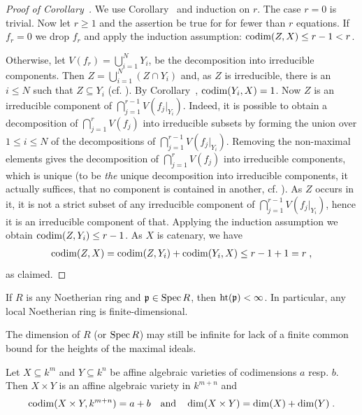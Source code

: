 \documentclass[a4paper,parskip=half,numbers=enddot, DIV=12]{scrreprt}
\begin{document}
\begin{proof}[Proof of Corollary~]
    We use Corollary~ and induction on $r$. The case $r=0$ is trivial. Now let $r\geq1$ and the assertion be true for for fewer than $r$ equations. If $f_r=0$ we drop $f_r$ and apply the induction assumption: $\operatorname{codim}(Z,X) \leq r-1< r $. 
    
    Otherwise, let $V(f_r) = \bigcup_{i=1}^N Y_i$, be the decomposition into irreducible components. Then $Z=\bigcup_{i=1}^N (Z\cap Y_i)$ and, as $Z$ is irreducible, there is an $i\leq N$ such that $Z\subseteq Y_i$ (cf. \cite[Proposition~2.1.1]{alg1}). By Corollary~, $\operatorname{codim}(Y_i,X) = 1$. Now $Z$ is an irreducible component of $ \bigcap_{j=1}^{r-1} V(f_j|_{Y_i})$. Indeed, it is possible to obtain a decomposition of $\bigcap_{j=1}^r V(f_j)$ into irreducible subsets by forming the union over $1\leq i\leq N$ of the decompositions of $ \bigcap_{j=1}^{r-1} V(f_j|_{Y_i})$. Removing the non-maximal elements gives the decomposition of $\bigcap_{j=1}^r V(f_j)$ into irreducible components, which is unique (to be \emph{the} unique decomposition into irreducible components, it actually suffices, that no component is contained in another, cf. \cite[Proposition~2.1.1]{alg1}). As $Z$ occurs in it, it is not a strict subset of any irreducible component of $\bigcap_{j=1}^{r-1} V(f_j|_{Y_i})$, hence it is an irreducible component of that. Applying the induction assumption we obtain $\operatorname{codim}(Z,Y_i)\leq r-1$. As $X$ is catenary, we have
    \begin{align*}
        \operatorname{codim}(Z,X) = \operatorname{codim}(Z,Y_i) +\operatorname{codim}(Y_i, X) \leq r-1+1 = r\;,
    \end{align*}
    as claimed.
\end{proof}
\begin{cor}
    If $R$ is any Noetherian ring and $\mathfrak{p}\in\operatorname{Spec} R$, then $\operatorname{ht}(\mathfrak{p}) < \infty$. In particular, any local Noetherian ring is finite-dimensional.
\end{cor}
\begin{rem*}
    The dimension of $R$ (or $\operatorname{Spec} R$) may still be infinite for lack of a finite common bound for the heights of the maximal ideals.
\end{rem*}
\begin{prop}
    Let $X\subseteq k^m$ and $Y\subseteq k^n$ be affine algebraic varieties of codimensions $a$ resp. $b$. Then $X\times Y$ is an affine algebraic variety in $k^{m+n}$ and
    \begin{align*}
    	\operatorname{codim}(X\times Y, k^{m+n})=a+b\quad\text{and}\quad\dim(X\times Y)=\dim (X)+\dim (Y)\;.
    \end{align*}
\end{prop}
\end{document}
